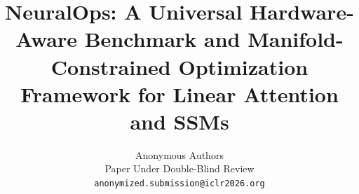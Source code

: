 \title{\textbf{NeuralOps: A Universal Hardware-Aware Benchmark and Manifold-Constrained Optimization Framework for Linear Attention and SSMs}}

\author{
    Anonymous Authors \\
    Paper Under Double-Blind Review \\
    \texttt{anonymized.submission@iclr2026.org}
}

\date{}
